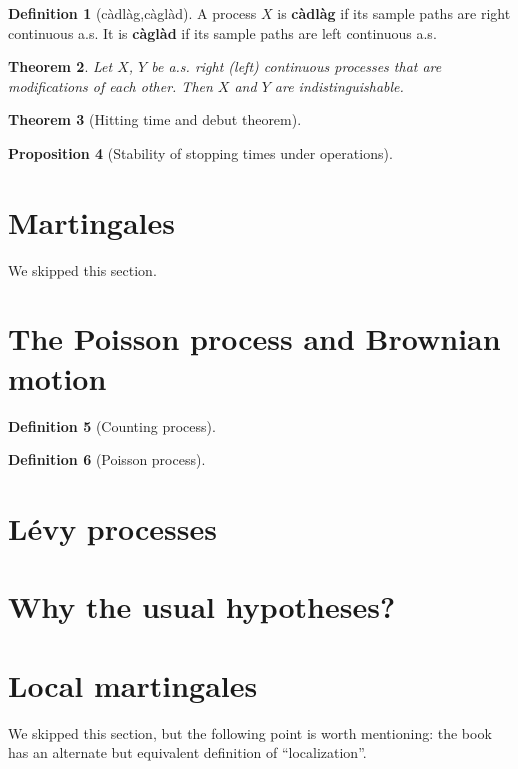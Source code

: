 \documentclass[openany,oneside]{book}
\newtheorem{thm}{Theorem}[section]
\newtheorem{prop}[thm]{Proposition}
\theoremstyle{definition}
\newtheorem{defn}[thm]{Definition}
\theoremstyle{remark}
\begin{document}
\begin{defn}[c{\`a}dl{\`a}g,c{\`a}gl{\`a}d]
A process $X$ is \textbf{c{\`a}dl{\`a}g} if its sample paths are right continuous a.s. It is \textbf{c{\`a}gl{\`a}d} if its sample paths are left continuous a.s.
\end{defn}

\begin{thm}
Let $X$, $Y$ be a.s. right (left) continuous processes that are modifications of each other. Then $X$ and $Y$ are indistinguishable.  
\end{thm}

\begin{thm}[Hitting time and debut theorem]

\end{thm}


\begin{prop}[Stability of stopping times under operations]

\end{prop}

\section{Martingales}
We skipped this section.


\section{The Poisson process and Brownian motion}

\begin{defn}[Counting process]

\end{defn}


\begin{defn}[Poisson process]

\end{defn}


\section{L\'evy processes}


\section{Why the usual hypotheses?}

\section{Local martingales}
We skipped this section, but the following point is worth mentioning: the book has an alternate but equivalent definition of ``localization''.
\end{document}
